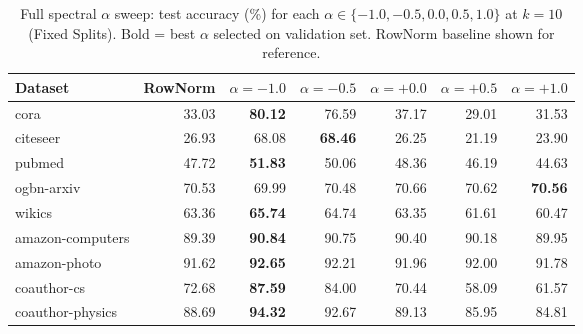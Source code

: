 \begin{table}[t]
\centering\small\setlength{\tabcolsep}{4pt}
\caption{Full spectral $\alpha$ sweep: test accuracy (\%) for each $\alpha \in \{-1.0, -0.5, 0.0, 0.5, 1.0\}$ at $k=10$ (Fixed Splits). Bold = best $\alpha$ selected on validation set. RowNorm baseline shown for reference.}
\label{tab:alpha_sweep_full_fixed}
\begin{tabular}{lrrrrrr}
\toprule
Dataset & RowNorm & $\alpha=-1.0$ & $\alpha=-0.5$ & $\alpha=+0.0$ & $\alpha=+0.5$ & $\alpha=+1.0$ \\
\midrule
cora & 33.03 & \textbf{80.12} & 76.59 & 37.17 & 29.01 & 31.53 \\
citeseer & 26.93 & 68.08 & \textbf{68.46} & 26.25 & 21.19 & 23.90 \\
pubmed & 47.72 & \textbf{51.83} & 50.06 & 48.36 & 46.19 & 44.63 \\
ogbn\mbox{-}arxiv & 70.53 & 69.99 & 70.48 & 70.66 & 70.62 & \textbf{70.56} \\
wikics & 63.36 & \textbf{65.74} & 64.74 & 63.35 & 61.61 & 60.47 \\
amazon\mbox{-}computers & 89.39 & \textbf{90.84} & 90.75 & 90.40 & 90.18 & 89.95 \\
amazon\mbox{-}photo & 91.62 & \textbf{92.65} & 92.21 & 91.96 & 92.00 & 91.78 \\
coauthor\mbox{-}cs & 72.68 & \textbf{87.59} & 84.00 & 70.44 & 58.09 & 61.57 \\
coauthor\mbox{-}physics & 88.69 & \textbf{94.32} & 92.67 & 89.13 & 85.95 & 84.81 \\
\bottomrule\end{tabular}\end{table}